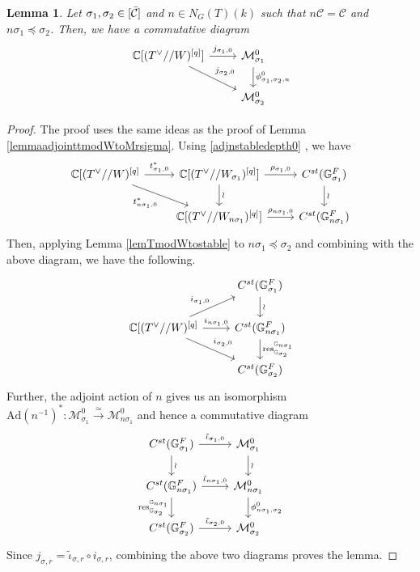 \documentclass[11 pt]{article}
\numberwithin{equation}{subsection}
\newtheorem{lemma}[theorem]{Lemma}
\theoremstyle{definition}
\theoremstyle{remark}
\theoremstyle{conjecture}
\newcommand{\res}{\mathrm{res}}
\newcommand{\Ad}{\mathrm{Ad}}
\newcommand{\C}{\mathbb C}
\newcommand{\G}{\mathbb G}
\newcommand{\M}{\mathcal{M}}
\newcommand{\mcC}{\mathcal C}
\begin{document}
\begin{lemma}\label{lemmaadjointTmodWtoM0sigma}
    Let $\sigma_1,\sigma_2\in [\Bar{\mcC}]$ and $n \in N_G(T)(k)$ such that $n\mcC=\mcC$ and $ n \sigma_1 \preceq \sigma_2$. Then, we have a commutative diagram
    \begin{equation*}
    \begin{tikzcd}
         \C[(T^\vee//W)^{[q]}]\arrow{r}{j_{\sigma_1,0}} \arrow{rd}{j_{\sigma_2,0}} & \M^0_{\sigma_1}\arrow{d}{\phi^0_{\sigma_1,\sigma_2,n}}\\
        & \M^0_{\sigma_2}
    \end{tikzcd}
\end{equation*}
\end{lemma}
\begin{proof}
     The proof uses the same ideas as the proof of Lemma \ref{lemmaadjointtmodWtoMrsigma}. Using \eqref{adjnstabledepth0} , we have 
    \begin{equation*}
         \begin{tikzcd}
       \C[(T^\vee//W)^{[q]} \arrow{r}{t^*_{\sigma_1,0}} \arrow[dr,"t^*_{n\sigma_1,0}"'] & \C[(T^\vee//W_{\sigma_1})^{[q]}]\arrow{d}{\wr} \arrow{r}{\rho_{\sigma_1,0}} & C^{st}(\G_{\sigma_1}^F) \arrow{d}{\wr} \\
        &\C[(T^\vee//W_{n\sigma_1})^{[q]}]\arrow{r}{\rho_{n\sigma_1,0}} & C^{st}(\G_{n\sigma_1}^F)
    \end{tikzcd}
    \end{equation*}
Then, applying  Lemma \ref{lemTmodWtostable} to $n\sigma_1\preceq \sigma_2$ and combining with the above diagram, we have the following.
\begin{equation*}
    \begin{tikzcd}
    &  C^{st}(\G_{\sigma_1}^F) \arrow{d}{\wr} \\
     \C[(T^\vee//W)^{[q]} \arrow{ur}{i_{\sigma_1,0}} \arrow[r,"i_{n\sigma_1,0}" ]  \arrow[rd, "i_{\sigma_2,0}" ] & C^{st}(\G_{n\sigma_1}^F) \arrow{d}{\res^{\G_{n\sigma_1}}_{\G_{\sigma_2}}} \\
     & C^{st}(\G_{\sigma_2}^F)
     \end{tikzcd}
\end{equation*}
Further, the adjoint action of $n$ gives us an isomorphism $\Ad(n^{-1})^*:\M^0_{\sigma_1} \xrightarrow{\simeq}\M^0_{n\sigma_1}$ and hence a commutative diagram 
   \begin{equation*}
        \begin{tikzcd}
          C^{st}(\G_{\sigma_1}^F) \arrow{r}{\tilde\iota_{\sigma_1,0}} \arrow{d}{\wr} &\M^0_{\sigma_1}\arrow{d}{\wr} \\
          C^{st}(\G_{n\sigma_1}^F) \arrow{r}{\tilde\iota_{n\sigma_1,0}}  \arrow{d}[swap]{\res^{\G_{n\sigma_1}}_{\G_{\sigma_2}}}&\M^0_{n\sigma_1}\arrow{d}{\phi^0_{n\sigma_1,\sigma_2}}\\
          C^{st}(\G_{\sigma_2}^F) \arrow{r}{\tilde\iota_{\sigma_2,0}}&\M^0_{\sigma_2}
        \end{tikzcd}
    \end{equation*}
    Since $j_{\sigma,r}= \tilde\iota_{\sigma,r}\circ i_{\sigma,r} $, combining the above two diagrams proves the lemma. 
\end{proof}
\end{document}
